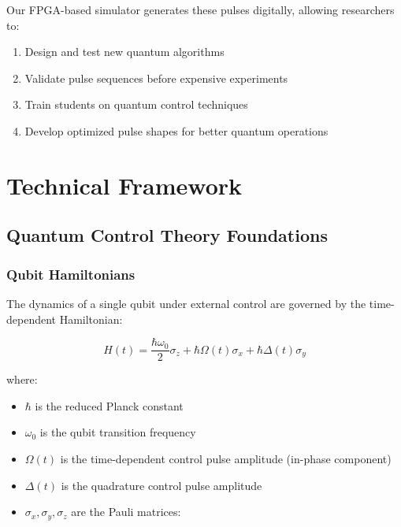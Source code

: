 \documentclass[12pt,a4paper]{article}
\theoremstyle{definition}
\begin{document}
Our FPGA-based simulator generates these pulses digitally, allowing researchers to:
\begin{enumerate}
    \item Design and test new quantum algorithms
    \item Validate pulse sequences before expensive experiments
    \item Train students on quantum control techniques
    \item Develop optimized pulse shapes for better quantum operations
\end{enumerate}

\section{Technical Framework}
\label{sec:technical}

\subsection{Quantum Control Theory Foundations}

\subsubsection{Qubit Hamiltonians}

The dynamics of a single qubit under external control are governed by the time-dependent Hamiltonian:

\begin{equation}
\boxed{
H(t) = \frac{\hbar \omega_0}{2}\sigma_z + \hbar \Omega(t)\sigma_x + \hbar \Delta(t)\sigma_y
}
\label{eq:hamiltonian}
\end{equation}

where:
\begin{itemize}
    \item $\hbar$ is the reduced Planck constant
    \item $\omega_0$ is the qubit transition frequency
    \item $\Omega(t)$ is the time-dependent control pulse amplitude (in-phase component)
    \item $\Delta(t)$ is the quadrature control pulse amplitude
    \item $\sigma_x, \sigma_y, \sigma_z$ are the Pauli matrices:
\end{itemize}
\end{document}
